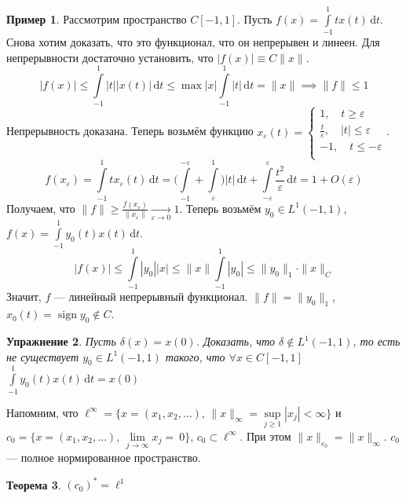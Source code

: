 \documentclass[11pt,openany,a4paper]{scrartcl}
\theoremstyle{plain}
\newtheorem{theorem}{Теорема}[section]
\newtheorem{exercise}[theorem]{Упражнение}
\theoremstyle{definition}
\newtheorem{example}[theorem]{Пример}
\newcommand{\underto}[1]{\xrightarrow[#1]{}}
\newcommand{\dif}{\, \mathrm d}
\DeclareMathOperator{\sign}{sign}
\begin{document}
\begin{example}
    Рассмотрим пространство $C[-1, 1]$. Пусть $f(x) = \int\limits_{-1}^1
    tx(t)\dif t$. Снова хотим доказать, что это функционал, что он непрерывен и 
    линеен.
    Для непрерывности достаточно установить, что $|f(x)| \equiv C\|x\|$.
    $$
    |f(x)| \leqslant \int\limits_{-1}^1 |t||x(t)|\dif t \leqslant
    \max |x| \int\limits_{-1}^1 |t|\dif t = \|x\| \implies \|f\| \leqslant 1
    $$
    Непрерывность доказана.
    Теперь возьмём функцию $x_\varepsilon(t) =
    \begin{cases}
        1,\quad t \geqslant \varepsilon \\
        \frac{t}{\varepsilon},\quad |t|\leqslant \varepsilon \\
        -1,\quad t \leqslant -\varepsilon\\
    \end{cases}$.
    $$
    f(x_\varepsilon) = \int\limits_{-1}^1 tx_\varepsilon(t)\dif t =
    \bigg(\int\limits_{-1}^{-\varepsilon} + \int\limits_\varepsilon^1\bigg)
    |t|\dif t + \int\limits_{-\varepsilon}^\varepsilon \frac{t^2}{\varepsilon}
    \dif t = 1 + O(\varepsilon)
    $$
    Получаем, что $\|f\|\geqslant \frac{f(x_\varepsilon)}{\|x_\varepsilon\|}
    \underto{\varepsilon \to 0} 1$.
    Теперь возьмём
    $y_0 \in L^1(-1, 1)$, $f(x) = \int\limits_{-1}^1 y_0(t)x(t)\dif t$.
    $$
    |f(x)| \leqslant \int\limits_{-1}^1 |y_0||x| \leqslant \|x\|\int\limits_{-1}^1
    |y_0| \leqslant \|y_0\|_1\cdot \|x\|_C
    $$
    Значит, $f$ — линейный непрерывный функционал. $\|f\|=\|y_0\|_1$,
    $x_0(t) = \sign y_0 \notin C$.
\end{example}
\begin{exercise}
    Пусть $\delta(x) = x(0)$. Доказать, что $\delta \notin L^1(-1, 1)$, то есть
    не существует $y_0 \in L^1(-1, 1)$ такого, что $\forall x\in C[-1, 1]$
    $\int\limits_{-1}^1 y_0(t)x(t)\dif t = x(0)$
\end{exercise}

Напомним, что $\ell^\infty = \{x = (x_1, x_2, \ldots),\, \|x\|_\infty = 
\sup\limits_{j \geqslant 1} |x_j| < \infty\}$ и
$c_0 = \{x = (x_1, x_2, \ldots),\, \lim\limits_{j \to \infty} x_j =~0\}$,
$c_0 \subset \ell^\infty$. При этом $\|x\|_{c_0} = \|x\|_\infty$. $c_0$ — полное
нормированное пространство.

\begin{theorem}
    $(c_0)^\ast = \ell^1$
\end{theorem}
\end{document}
